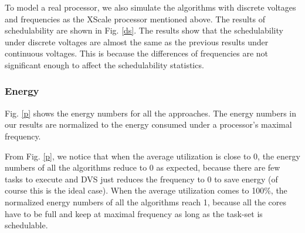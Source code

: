 \documentclass[12pt, journal,compsoc]{IEEEtran}
\begin{document}
To model a real processor, we also simulate the algorithms with discrete voltages and frequencies as the XScale processor mentioned above. The results of schedulability are shown in Fig. \ref{ds}. The results show that the schedulability under discrete voltages are almost the same as the previous results under continuous voltages. This is because the differences of frequencies are not significant enough to affect the schedulability statistics.

\begin{figure*}[!t]
\centering
{}
\hspace{-0.2in}
\hspace{-0.2in}
\hspace{-0.2in}
\caption{Energy simulation results (under continuous voltages/frequencies).}
\label{p}
\end{figure*}

\begin{figure*}[!t]
\centering
{}
\hspace{-0.2in}
\hspace{-0.2in}
\hspace{-0.2in}
\caption{Energy simulation results (under discrete voltages/frequencies).}
\label{dp}
\end{figure*}


\subsubsection{Energy}

Fig. \ref{p} shows the energy numbers for all the approaches.
The energy numbers in our results are normalized to the energy consumed under a processor's maximal frequency.

From Fig. \ref{p}, we notice that when the average utilization is close to 0, the energy numbers of all the algorithms reduce to 0 as expected, because there are few tasks to execute and DVS just reduces the frequency to 0 to save energy (of course this is the ideal case). When the average utilization comes to 100\%, the normalized energy numbers of all the algorithms reach 1, because all the cores have to be full and keep at maximal frequency as long as the task-set is schedulable.
\end{document}
